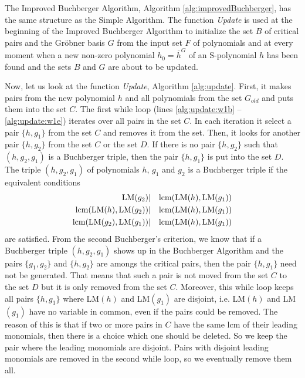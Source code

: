 The Improved Buchberger Algorithm, Algorithm \ref{alg:improvedBuchberger}, has the same structure as the Simple Algorithm. The function \textit{Update} is used at the beginning of the Improved Buchberger Algorithm to initialize the set $B$ of critical pairs and the Gr\"obner basis $G$ from the input set $F$ of polynomials and at every moment when a new non-zero polynomial $h_0 = \overline{h}^G$ of an S-polynomial $h$ has been found and the sets $B$ and $G$ are about to be updated.



Now, let us look at the function \textit{Update}, Algorithm \ref{alg:update}. First, it makes pairs from the new polynomial $h$ and all polynomials from the set $G_{old}$ and puts them into the set $C$. The first while loop (lines \ref{alg:update:w1b} -- \ref{alg:update:w1e}) iterates over all pairs in the set $C$. In each iteration it select a pair $\{h, g_1\}$ from the set $C$ and removes it from the set. Then, it looks for another pair $\{h, g_2\}$ from the set $C$ or the set $D$. If there is no pair $\{h, g_2\}$ such that $(h, g_2, g_1)$ is a Buchberger triple, then the pair $\{h, g_1\}$ is put into the set $D$. The triple $(h, g_2, g_1)$ of polynomials $h$, $g_1$ and $g_2$ is a Buchberger triple if the equivalent conditions 
\begin{eqnarray}
	\operatorname{LM}(g_2) &|& \operatorname{lcm}(\operatorname{LM}(h), \operatorname{LM}(g_1))\\
	\operatorname{lcm}(\operatorname{LM}(h), \operatorname{LM}(g_2) ) &|& \operatorname{lcm}(\operatorname{LM}(h), \operatorname{LM}(g_1))\\
	\operatorname{lcm}(\operatorname{LM}(g_2), \operatorname{LM}(g_1)) &|& \operatorname{lcm}(\operatorname{LM}(h), \operatorname{LM}(g_1))
\end{eqnarray}
are satisfied. From the second Buchberger's criterion, we know that if a Buchberger triple $(h, g_2, g_1)$ shows up in the Buchberger Algorithm and the pairs $\{g_1, g_2\}$ and $\{h, g_2\}$ are amongs the critical pairs, then the pair $\{h, g_1\}$ need not be generated. That means that such a pair is not moved from the set $C$ to the set $D$ but it is only removed from the set $C$. Moreover, this while loop keeps all pairs $\{h, g_1\}$ where LM$(h)$ and LM$(g_1)$ are disjoint, i.e. LM$(h)$ and LM$(g_1)$ have no variable in common, even if the pairs could be removed. The reason of this is that if two or more pairs in $C$ have the same lcm of their leading monomials, then there is a choice which one should be deleted. So we keep the pair where the leading monomials are disjoint. Pairs with disjoint leading monomials are removed in the second while loop, so we eventually remove them all.

